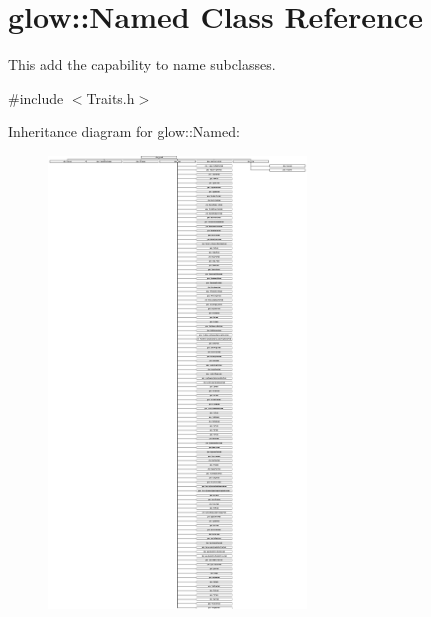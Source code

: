 \hypertarget{classglow_1_1_named}{}\section{glow\+:\+:Named Class Reference}
\label{classglow_1_1_named}


This add the capability to name subclasses.  




{\ttfamily \#include $<$Traits.\+h$>$}

Inheritance diagram for glow\+:\+:Named\+:\begin{figure}[H]
\begin{center}
\leavevmode
\includegraphics[height=12.000000cm]{classglow_1_1_named}
\end{center}
\end{figure}
